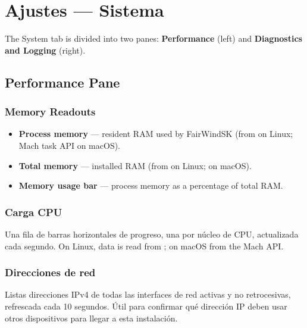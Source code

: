 \chapter{Ajustes --- Sistema}
\label{ch:settings-system}

The System tab is divided into two panes: \textbf{Performance} (left) and
\textbf{Diagnostics and Logging} (right).


\section{Performance Pane}

\subsection{Memory Readouts}

\begin{itemize}
  \item \textbf{Process memory} --- resident RAM used by FairWindSK
        (from  on Linux; Mach task API on macOS).
  \item \textbf{Total memory} --- installed RAM
        (from  on Linux;  on macOS).
  \item \textbf{Memory usage bar} --- process memory as a percentage of total RAM.
\end{itemize}

\subsection{Carga CPU}

Una fila de barras horizontales de progreso, una por núcleo de CPU, actualizada cada segundo.
On Linux, data is read from ;
on macOS from the Mach  API.

\subsection{Direcciones de red}

Listas direcciones IPv4 de todas las interfaces de red activas y no retrocesivas, refrescada cada 10 segundos.
Útil para confirmar qué dirección IP deben usar otros dispositivos para llegar a esta instalación.


